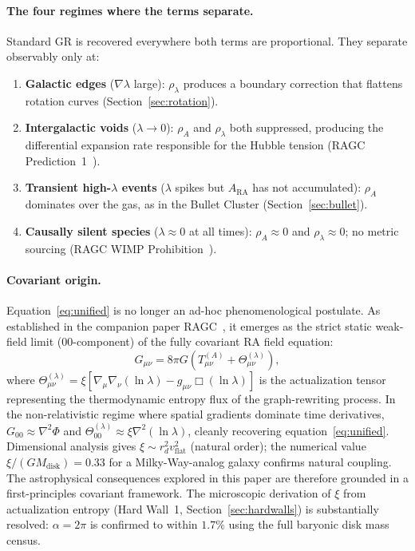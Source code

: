 \documentclass[11pt,a4paper]{article}
\theoremstyle{plain}
\theoremstyle{definition}
\theoremstyle{remark}
\newcommand{\ARA}{A_{\mathrm{RA}}}
\begin{document}
\paragraph{The four regimes where the terms separate.}
Standard GR is recovered everywhere both terms are proportional. They separate
observably only at:
\begin{enumerate}[noitemsep]
  \item \textbf{Galactic edges} ($\nabla\lambda$ large): $\rho_\lambda$ produces
  a boundary correction that flattens rotation curves (Section~\ref{sec:rotation}).
  \item \textbf{Intergalactic voids} ($\lambda \to 0$): $\rho_A$ and $\rho_\lambda$
  both suppressed, producing the differential expansion rate responsible for the
  Hubble tension (RAGC Prediction~1~\citep{Sandeman2026b}).
  \item \textbf{Transient high-$\lambda$ events} ($\lambda$ spikes but
  $\ARA$ has not accumulated): $\rho_A$ dominates over the gas, as in the
  Bullet Cluster (Section~\ref{sec:bullet}).
  \item \textbf{Causally silent species} ($\lambda \approx 0$ at all times):
  $\rho_A \approx 0$ and $\rho_\lambda \approx 0$; no metric sourcing
  (RAGC WIMP Prohibition~\citep{Sandeman2026b}).
\end{enumerate}

\paragraph{Covariant origin.}
Equation~\eqref{eq:unified} is no longer an ad-hoc phenomenological postulate.
As established in the companion paper RAGC~\citep{Sandeman2026b}, it emerges as
the strict static weak-field limit ($00$-component) of the fully covariant RA
field equation:
\begin{equation}
  G_{\mu\nu} = 8\pi G\!\left(T_{\mu\nu}^{(A)}
    + \Theta_{\mu\nu}^{(\lambda)}\right),
  \label{eq:covariant_field}
\end{equation}
where $\Theta_{\mu\nu}^{(\lambda)} = \xi[\nabla_\mu\nabla_\nu(\ln\lambda)
- g_{\mu\nu}\Box(\ln\lambda)]$ is the actualization tensor representing the
thermodynamic entropy flux of the graph-rewriting process. In the
non-relativistic regime where spatial gradients dominate time derivatives,
$G_{00} \approx \nabla^2\Phi$ and
$\Theta_{00}^{(\lambda)} \approx \xi\nabla^2(\ln\lambda)$, cleanly recovering
equation~\eqref{eq:unified}. Dimensional analysis gives
$\xi \sim r_d^2 v_{\mathrm{flat}}^2$ (natural order); the numerical value
$\xi/(G M_{\mathrm{disk}}) = 0.33$ for a Milky-Way-analog galaxy confirms
natural coupling. The astrophysical consequences explored in this paper are
therefore grounded in a first-principles covariant framework. The microscopic
derivation of $\xi$ from actualization entropy (Hard Wall~1,
Section~\ref{sec:hardwalls}) is substantially resolved: $\alpha = 2\pi$
is confirmed to within $1.7\%$ using the full baryonic disk mass census.
\end{document}
